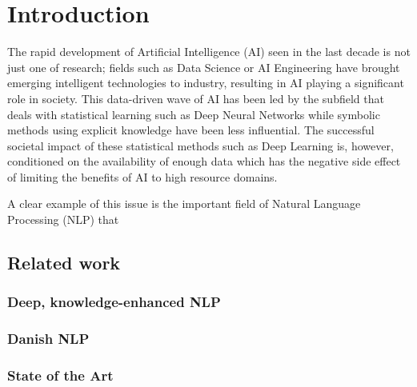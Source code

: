 \documentclass[main.tex]{subfiles}
\begin{document}
\chapter{Introduction}
The rapid development of Artificial Intelligence (AI) seen in the last decade is not just one of research;
fields such as Data Science or AI Engineering have brought emerging intelligent technologies to industry, resulting in AI playing a significant role in society.
This data-driven wave of AI has been led by the subfield that deals with statistical learning such as Deep Neural Networks while symbolic methods using explicit knowledge have been less influential.
The successful societal impact of these statistical methods such as Deep Learning is, however, conditioned on the availability of enough data which has the negative side effect of limiting the benefits of AI to high resource domains.

A clear example of this issue is the important field of Natural Language Processing (NLP) that
\section{Related work}
\subsection{Deep, knowledge-enhanced NLP}
\subsection{Danish NLP}
\subsection{State of the Art}
\end{document}
